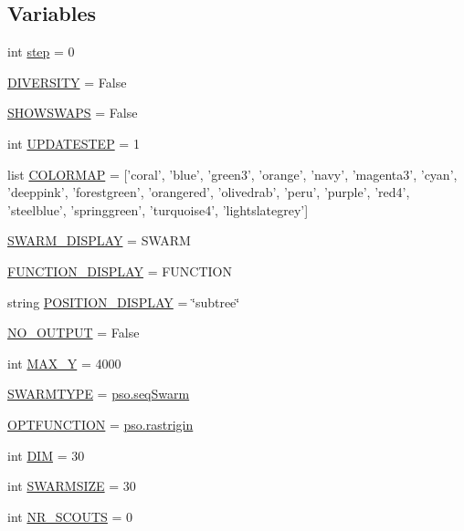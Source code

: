 \subsection*{Variables}
\begin{CompactItemize}
\item 
int \hyperlink{namespacepsostart_f9fd983d5b47b56a5522ca953d16996f}{step} = 0
\item 
\hyperlink{namespacepsostart_3cd1480e6bb9b8b9ce11a0e7cff137c3}{DIVERSITY} = False
\item 
\hyperlink{namespacepsostart_c4e0e1009671f83d53078da786b64bce}{SHOWSWAPS} = False
\item 
int \hyperlink{namespacepsostart_955e2448af0db62cef11a23f08cf20c8}{UPDATESTEP} = 1
\item 
list \hyperlink{namespacepsostart_ee730049d118cbfc995e5e7f12469d3d}{COLORMAP} = \mbox{[}'coral', 'blue', 'green3', 'orange', 'navy', 'magenta3', 'cyan', 'deeppink', 'forestgreen', 'orangered', 'olivedrab', 'peru', 'purple', 'red4', 'steelblue', 'springgreen', 'turquoise4', 'lightslategrey'\mbox{]}
\item 
\hyperlink{namespacepsostart_444d7eb0307e3f2a481d35f6e99da2bc}{SWARM\_\-DISPLAY} = SWARM
\item 
\hyperlink{namespacepsostart_5de92f4d164f675bd3917d65b6687266}{FUNCTION\_\-DISPLAY} = FUNCTION
\item 
string \hyperlink{namespacepsostart_af21f1269d56b7712e089a0f3ac34417}{POSITION\_\-DISPLAY} = \char`\"{}subtree\char`\"{}
\item 
\hyperlink{namespacepsostart_fbfb114617ecd765efb5729837d9a1a8}{NO\_\-OUTPUT} = False
\item 
int \hyperlink{namespacepsostart_69037b57c1ff25824dbcbbe17807d2d7}{MAX\_\-Y} = 4000
\item 
\hyperlink{namespacepsostart_302a241641c5bb2a7c560bc1a216ff64}{SWARMTYPE} = \hyperlink{namespacepso_958a3bcd6a80cc329bf7ee6ee063e7b9}{pso.seqSwarm}
\item 
\hyperlink{namespacepsostart_03fea5b845e55f82f3c7d947c79222b0}{OPTFUNCTION} = \hyperlink{namespacepso_b5880ea7f40f444b4960ea8bee95ff27}{pso.rastrigin}
\item 
int \hyperlink{namespacepsostart_20ff68f62c8d02cee1a5fe3c9a2883ed}{DIM} = 30
\item 
int \hyperlink{namespacepsostart_ba1e88de83b58e8cdc0184dc3407c373}{SWARMSIZE} = 30
\item 
int \hyperlink{namespacepsostart_f25b4590bbc3756e6f18e18686ed8938}{NR\_\-SCOUTS} = 0
\item 

\end{CompactItemize}
